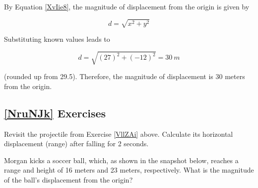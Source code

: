 \documentclass[main-physics.tex]{subfiles}
\begin{document}
By Equation \eqref{XvIie8}, the magnitude of displacement from the origin is given by

\begin{equation*}
    d = \sqrt{x^2 + y^2}
\end{equation*}

Substituting known values leads to

\begin{equation*}
    d = \sqrt{\left(27\right)^2 + \left(-12\right)^2} = \SI{30}{m}
\end{equation*}

(rounded up from 29.5). Therefore, the magnitude of displacement is 30 meters from the origin.

\endsolution

\subsection*{\ref{NruNJk} Exercises}

\begin{exercise} \label{Oj68jK}
    Revisit the projectile from Exercise \ref{VllZAi} above. Calculate its horizontal displacement (range) after falling for 2 seconds.
\end{exercise}

\begin{exercise} \label{BqN1QL}
    Morgan kicks a soccer ball, which, as shown in the snapshot below, reaches a range and height of 16 meters and 23 meters, respectively. What is the magnitude of the ball's displacement from the origin?
\end{exercise}

\begin{center}
\end{center}
\end{document}
